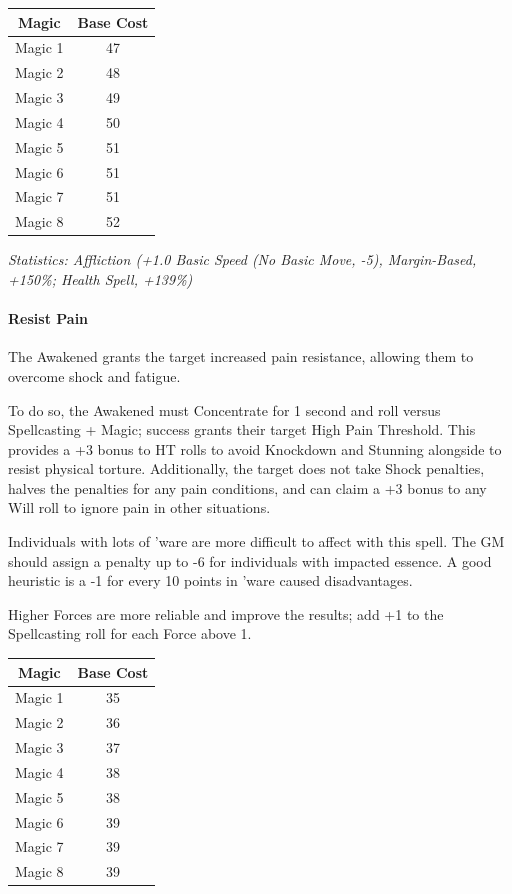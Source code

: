 \begin{multicols}{3}
	\begin{center}
		\begin{tabular}{|c|c|}
			\hline
			Magic & Base Cost \\
			\hline
			\hline
			Magic 1 & 47 \\
			Magic 2 & 48 \\
			Magic 3 & 49  \\
			Magic 4 & 50 \\
			Magic 5 & 51 \\
			Magic 6 & 51 \\
			Magic 7 & 51 \\
			Magic 8 & 52 \\
			\hline
		\end{tabular}
	\end{center}
	
	\textcolor{OliveGreen}{\textit{Statistics: Affliction (+1.0 Basic Speed (No Basic Move, -5), Margin-Based, +150\%; Health Spell, +139\%) }}
	
	\paragraph{Resist Pain}
	
	The Awakened grants the target increased pain resistance, allowing them to overcome shock and fatigue.
	
	To do so, the Awakened must Concentrate for 1 second and roll versus Spellcasting + Magic; success grants their target High Pain Threshold. This provides a +3 bonus to HT rolls to avoid Knockdown and Stunning alongside to resist physical torture. Additionally, the target does not take Shock penalties, halves the penalties for any pain conditions, and can claim a +3 bonus to any Will roll to ignore pain in other situations.
	
	Individuals with lots of 'ware are more difficult to affect with this spell. The GM should assign a penalty up to -6 for individuals with impacted essence. A good heuristic is a -1 for every 10 points in 'ware caused disadvantages.
	
	Higher Forces are more reliable and improve the results; add +1 to the Spellcasting roll for each Force above 1.
	
	\begin{center}
		\begin{tabular}{|c|c|}
			\hline
			Magic & Base Cost \\
			\hline
			\hline
			Magic 1 & 35 \\
			Magic 2 & 36 \\
			Magic 3 & 37  \\
			Magic 4 & 38 \\
			Magic 5 & 38 \\
			Magic 6 & 39 \\
			Magic 7 & 39 \\
			Magic 8 & 39 \\
			\hline
		\end{tabular}
	\end{center}
		

\end{multicols}

